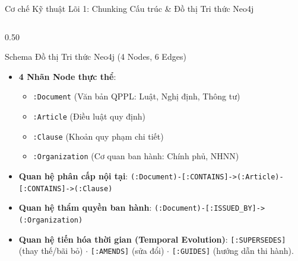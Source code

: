 \documentclass[aspectratio=169,10pt,xcolor={table}]{beamer}
\begin{document}
\begin{frame}{Cơ chế Kỹ thuật Lõi 1: Chunking Cấu trúc \& Đồ thị Tri thức Neo4j}
\begin{columns}[T]
\begin{column}{0.50\textwidth}
\begin{block}{\small Schema Đồ thị Tri thức Neo4j (4 Nodes, 6 Edges)}
\footnotesize
\begin{itemize}
  \item \textbf{4 Nhãn Node thực thể}:
    \begin{itemize}\scriptsize
      \item \texttt{:Document} (Văn bản QPPL: Luật, Nghị định, Thông tư)
      \item \texttt{:Article} (Điều luật quy định)
      \item \texttt{:Clause} (Khoản quy phạm chi tiết)
      \item \texttt{:Organization} (Cơ quan ban hành: Chính phủ, NHNN)
    \end{itemize}
  \item \textbf{Quan hệ phân cấp nội tại}:
    \newline \texttt{(:Document)-[:CONTAINS]->(:Article)-[:CONTAINS]->(:Clause)}
  \item \textbf{Quan hệ thẩm quyền ban hành}:
    \newline \texttt{(:Document)-[:ISSUED\_BY]->(:Organization)}
  \item \textbf{Quan hệ tiến hóa thời gian (Temporal Evolution)}:
    \newline \texttt{[:SUPERSEDES]} (thay thế/bãi bỏ) $\cdot$ \texttt{[:AMENDS]} (sửa đổi) $\cdot$ \texttt{[:GUIDES]} (hướng dẫn thi hành).
\end{itemize}
\end{block}
\end{column}
\end{columns}
\end{frame}
\end{document}
